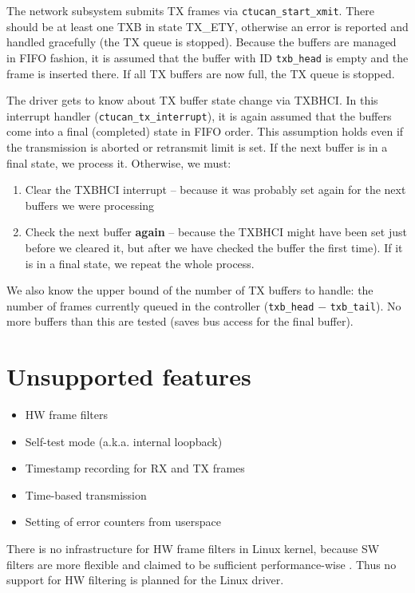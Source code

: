 The network subsystem submits TX frames via \verb|ctucan_start_xmit|.
There should be at least one TXB in state TX\_ETY, otherwise an error is reported
and handled gracefully (the TX queue is stopped). Because the buffers are managed in FIFO fashion,
it is assumed that the buffer with ID \verb|txb_head| is empty and the frame is inserted there.
If all TX buffers are now full, the TX queue is stopped.

The driver gets to know about TX buffer state change via TXBHCI. In
this interrupt handler (\verb|ctucan_tx_interrupt|), it is again assumed that
the buffers come into a final (completed) state in FIFO order. This assumption
holds even if the transmission is aborted or retransmit limit is set.
If the next buffer is in a final state, we process it. Otherwise, we must:
\begin{enumerate}
\item Clear the TXBHCI interrupt -- because it was probably set again for the
      next buffers we were processing
\item Check the next buffer \textbf{again} -- because the TXBHCI might have been
      set just before we cleared it, but after we have checked the buffer the
      first time). If it is in a final state, we repeat the whole process.
\end{enumerate}

We also know the upper bound of the number of TX buffers to handle: the number
of frames currently queued in the controller (\verb|txb_head| $-$ \verb|txb_tail|).
No more buffers than this are tested (saves bus access for the final buffer).

\section{Unsupported features}
\label{sec:linux:unsupported-features}

\begin{itemize}
\item HW frame filters
\item Self-test mode (a.k.a. internal loopback)
\item Timestamp recording for RX and TX frames
\item Time-based transmission
\item Setting of error counters from userspace
\end{itemize}

There is no infrastructure for HW frame filters in Linux kernel, because SW filters
are more flexible and claimed to be sufficient performance-wise \cite{linux:socketcan}.
Thus no support for HW filtering is planned for the Linux driver.

